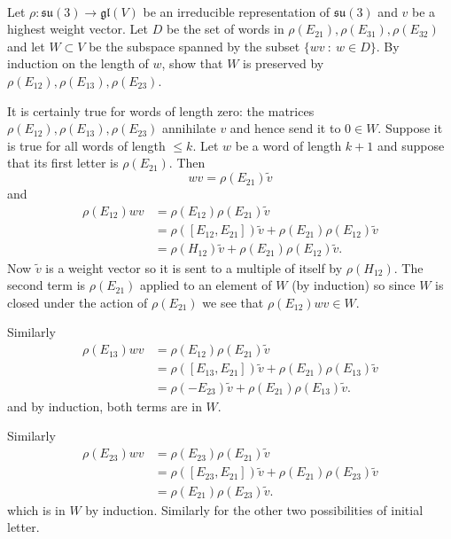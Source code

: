 \documentclass[12pt]{article}
\begin{document}
\bigskip

\begin{question}\ \\
Let $\rho\colon\mathfrak{su}(3)\to\mathfrak{gl}(V)$ be an irreducible representation of $\mathfrak{su}(3)$ and $v$ be a highest weight vector. Let $D$ be the set of words in $\rho(E_{21}),\rho(E_{31}),\rho(E_{32})$ and let $W\subset V$ be the subspace spanned by the subset $\{wv\ :\ w\in D\}$. By induction on the length of $w$, show that $W$ is preserved by $\rho(E_{12}),\rho(E_{13}),\rho(E_{23})$.
\end{question}

\begin{answer}
It is certainly true for words of length zero: the matrices $\rho(E_{12}),\rho(E_{13}),\rho(E_{23})$ annihilate $v$ and hence send it to $0\in W$. Suppose it is true for all words of length $\leq k$. Let $w$ be a word of length $k+1$ and suppose that its first letter is $\rho(E_{21})$. Then
\[wv=\rho(E_{21})\tilde{v}\]
and
\begin{align*}
\rho(E_{12})wv&=\rho(E_{12})\rho(E_{21})\tilde{v}\\
&=\rho([E_{12},E_{21}])\tilde{v}+\rho(E_{21})\rho(E_{12})\tilde{v}\\
&=\rho(H_{12})\tilde{v}+\rho(E_{21})\rho(E_{12})\tilde{v}.
\end{align*}
Now $\tilde{v}$ is a weight vector so it is sent to a multiple of itself by $\rho(H_{12})$. The second term is $\rho(E_{21})$ applied to an element of $W$ (by induction) so since $W$ is closed under the action of $\rho(E_{21})$ we see that $\rho(E_{12})wv\in W$.

Similarly
\begin{align*}
\rho(E_{13})wv&=\rho(E_{12})\rho(E_{21})\tilde{v}\\
&=\rho([E_{13},E_{21}])\tilde{v}+\rho(E_{21})\rho(E_{13})\tilde{v}\\
&=\rho(-E_{23})\tilde{v}+\rho(E_{21})\rho(E_{13})\tilde{v}.
\end{align*}
and by induction, both terms are in $W$.

Similarly
\begin{align*}
\rho(E_{23})wv&=\rho(E_{23})\rho(E_{21})\tilde{v}\\
&=\rho([E_{23},E_{21}])\tilde{v}+\rho(E_{21})\rho(E_{23})\tilde{v}\\
&=\rho(E_{21})\rho(E_{23})\tilde{v}.
\end{align*}
which is in $W$ by induction. Similarly for the other two possibilities of initial letter.
\end{answer}
\newpage
\end{document}
